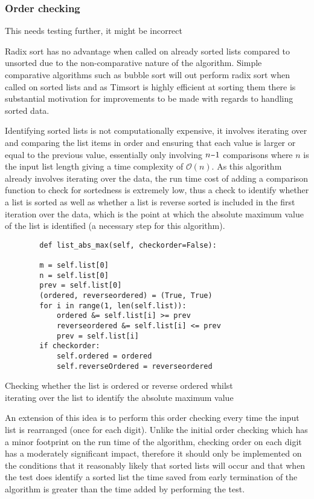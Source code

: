 \documentclass[12pt]{article}
\newcommand{\minus}{\scalebox{0.75}[1.0]{$-$}}
\begin{document}
	\subsubsection{Order checking}
	\label{sssec:order}
	{\color{red} This needs testing further, it might be incorrect}
	\par
Radix sort has no advantage when called on already sorted lists compared to unsorted due to the non-comparative nature of the algorithm. Simple comparative algorithms such as bubble sort will out perform radix sort when called on sorted lists and as Timsort is highly efficient at sorting them there is substantial motivation for improvements to be made with regards to handling sorted data.
\par
Identifying sorted lists is not computationally expensive, it involves iterating over and comparing the list items in order and ensuring that each value is larger or equal to the previous value, essentially only involving $n\minus1$ comparisons where $n$ is the input list length giving a time complexity of $\mathcal{O}(n)$. As this algorithm already involves iterating over the data, the run time cost of adding a comparison function to check for sortedness is extremely low, thus a check to identify whether a list is sorted as well as whether a list is reverse sorted is included in the first iteration over the data, which is the point at which the absolute maximum value of the list is identified (a necessary step for this algorithm).
\begin{table}[H]
	\centering
	\begin{lstlisting}
		def list_abs_max(self, checkorder=False):
	
		m = self.list[0]
		n = self.list[0]
		prev = self.list[0]
		(ordered, reverseordered) = (True, True)
		for i in range(1, len(self.list)):
			ordered &= self.list[i] >= prev
			reverseordered &= self.list[i] <= prev
			prev = self.list[i]
		if checkorder:
			self.ordered = ordered
			self.reverseOrdered = reverseordered
	\end{lstlisting}
	\caption*{Checking whether the list is ordered or reverse ordered whilst\\ iterating over the list to identify the absolute maximum value}
\end{table}
\par
An extension of this idea is to perform this order checking every time the input list is rearranged (once for each digit). Unlike the initial order checking which has a minor footprint on the run time of the algorithm, checking order on each digit has a moderately significant impact, therefore it should only be implemented on the conditions that it reasonably likely that sorted lists will occur and that when the test does identify a sorted list the time saved from early termination of the algorithm is greater than the time added by performing the test. 
\end{document}
